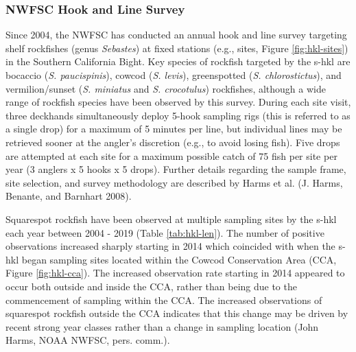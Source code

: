 \documentclass[11pt,
  english,
  a4paper,
]{article}
\begin{document}
\leavevmode\tagmcend\tagstructend


\hypertarget{nwfsc-hook-and-line-survey}{%
\subsubsection{NWFSC Hook and Line Survey}\label{nwfsc-hook-and-line-survey}}

\leavevmode\tagmcend\tagstructend


Since 2004, the NWFSC has conducted an annual hook and line survey targeting shelf rockfishes (genus \emph{Sebastes}) at fixed stations (e.g., sites, Figure \ref{fig:hkl-sites}) in the Southern California Bight. Key species of rockfish targeted by the \gls{s-hkl} are bocaccio (\emph{S. paucispinis}), cowcod (\emph{S. levis}), greenspotted (\emph{S. chlorostictus}), and vermilion/sunset (\emph{S. miniatus} and \emph{S. crocotulus}) rockfishes, although a wide range of rockfish species have been observed by this survey. During each site visit, three deckhands simultaneously deploy 5-hook sampling rigs (this is referred to as a single drop) for a maximum of 5 minutes per line, but individual lines may be retrieved sooner at the angler's discretion (e.g., to avoid losing fish). Five drops are attempted at each site for a maximum possible catch of 75 fish per site per year (3 anglers x 5 hooks x 5 drops). Further details regarding the sample frame, site selection, and survey methodology are described by Harms et al. {(J. Harms, Benante, and Barnhart 2008)\leavevmode\tagmcend\tagstructend}.

\leavevmode\tagmcend\tagstructend\par


Squarespot rockfish have been observed at multiple sampling sites by the \Gls{s-hkl} each year between 2004 - 2019 (Table \ref{tab:hkl-len}). The number of positive observations increased sharply starting in 2014 which coincided with when the \gls{s-hkl} began sampling sites located within the Cowcod Conservation Area (CCA, Figure \ref{fig:hkl-cca}). The increased observation rate starting in 2014 appeared to occur both outside and inside the CCA, rather than being due to the commencement of sampling within the CCA. The increased observations of squarespot rockfish outside the CCA indicates that this change may be driven by recent strong year classes rather than a change in sampling location (John Harms, NOAA NWFSC, pers. comm.).
\end{document}
